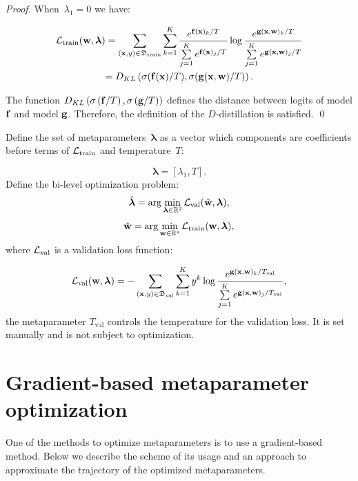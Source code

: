 \documentclass[runningheads]{llncs}
\begin{document}
\begin{proof}
When~$\lambda_1 = 0$ we have:

\begin{multline*}
    \mathcal{L}_\text{train}(\mathbf{w}, \boldsymbol{\lambda}) = \sum\limits_{(\mathbf{x}, y) \in \mathfrak{D}_\text{train}}\sum\limits_{k=1}^{K}\frac{e^{\mathbf{f}(\mathbf{x})_k/T}}{\sum\limits_{j=1}^{K}e^{\mathbf{f}(\mathbf{x})_j/T}}\log \frac{e^{\mathbf{g}(\mathbf{x}, \mathbf{w})_k/T}}{\sum\limits_{j=1}^{K}e^{\mathbf{g}(\mathbf{x}, \mathbf{w})_j/T}} \\= D_{KL}\left(\sigma(\mathbf{f}(\mathbf{x})/T), \sigma(\mathbf{g}(\mathbf{x}, \mathbf{w})/T)\right).
\end{multline*}

The function $D_{KL}\left(\sigma\left(\mathbf{f}/T\right), \sigma\left(\mathbf{g}/T\right)\right)$ defines the distance between logits of model $\mathbf{f}$ and model $\mathbf{g}$. Therefore, the definition of the $D$-distillation is satisfied. \qed

\end{proof}


Define the set of metaparameters~$\boldsymbol{\lambda}$ as a vector which components are coefficients before terms of $\mathcal{L}_\text{train}$ and temperature~$T$:

\[\boldsymbol{\lambda} = [\lambda_1, T].\]
Define the bi-level optimization problem:
\begin{equation} \label{eq:opt_hyp}
    \hat{\boldsymbol{\lambda}} = \arg\min\limits_{\boldsymbol{\lambda} \in \mathbb{R}^2} \mathcal{L}_\text{val}(\hat{\mathbf{w}}, \boldsymbol{\lambda}),
\end{equation}
\begin{equation} \label{eq:opt_param}
    \hat{\mathbf{w}} = \arg\min\limits_{\mathbf{w} \in \mathbb{R}^s} \mathcal{L}_\text{train}(\mathbf{w}, \boldsymbol{\lambda}),
\end{equation}
where $\mathcal{L}_\text{val}$ is a validation loss function:

$$
     \mathcal{L}_\text{val}(\mathbf{w}, \boldsymbol{\lambda}) = - \sum\limits_{(\mathbf{x}, y) \in \mathfrak{D}_\text{val}}\sum\limits_{k=1}^{K}y^k\log \frac{e^{\mathbf{g}(\mathbf{x}, \mathbf{w})_k/T_\text{val}}}{\sum\limits_{j=1}^Ke^{\mathbf{g}(\mathbf{x}, \mathbf{w})_j/T_\text{val}}},
$$
the metaparameter $T_\text{val}$ controls the temperature for the validation loss. It is set manually and is not subject to optimization. 
\section{Gradient-based metaparameter optimization}
One of the methods to  optimize metaparameters is to use a gradient-based method. Below we describe the scheme of its usage and an approach to approximate the trajectory of the optimized metaparameters.
\end{document}
